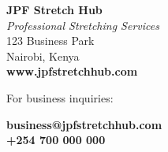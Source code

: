 \begin{tcolorbox}[
    enhanced,
    title={Client Information},
    attach boxed title to top left,
    boxed title style={
        colback=info!50,
        colframe=info!50,
        arc=0mm,
    },
    colback=white,
    colframe=info!50,
    arc=0mm,
    fonttitle=\bfseries
]
    \begin{center}
        \textbf{JPF Stretch Hub}\\
        \vspace{0.2cm}
        \textit{Professional Stretching Services}\\
        \vspace{0.3cm}
        123 Business Park\\
        Nairobi, Kenya\\
        \vspace{0.2cm}
        \textbf{www.jpfstretchhub.com}
    \end{center}
    
    \vspace{0.2cm}
    For business inquiries:
    \begin{center}
        \textbf{business@jpfstretchhub.com}\\
        \textbf{+254 700 000 000}
    \end{center}
\end{tcolorbox}

